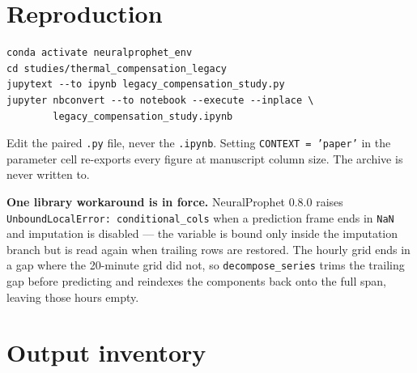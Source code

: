 \documentclass[11pt,a4paper]{article}
\begin{document}
\appendix
\section{Reproduction}

\begin{verbatim}
conda activate neuralprophet_env
cd studies/thermal_compensation_legacy
jupytext --to ipynb legacy_compensation_study.py
jupyter nbconvert --to notebook --execute --inplace \
        legacy_compensation_study.ipynb
\end{verbatim}

\noindent Edit the paired \texttt{.py} file, never the \texttt{.ipynb}. Setting
\texttt{CONTEXT = 'paper'} in the parameter cell re-exports every figure at manuscript
column size. The archive is never written to.

\medskip
\noindent\textbf{One library workaround is in force.} NeuralProphet 0.8.0 raises
\texttt{UnboundLocalError: conditional\_cols} when a prediction frame ends in
\texttt{NaN} and imputation is disabled --- the variable is bound only inside the
imputation branch but is read again when trailing rows are restored. The hourly grid
ends in a gap where the 20-minute grid did not, so \texttt{decompose\_series} trims the
trailing gap before predicting and reindexes the components back onto the full span,
leaving those hours empty.

\section{Output inventory}
\end{document}
